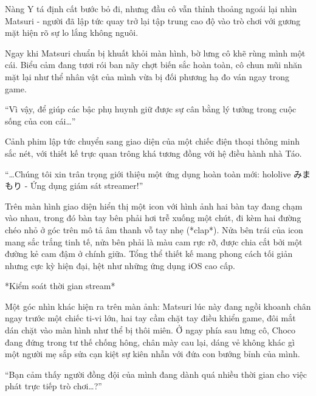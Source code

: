 \documentclass[../main.tex]{subfiles}
\begin{document}
Nàng Y tá định cất bước bỏ đi, nhưng đầu cô vẫn thỉnh thoảng ngoái lại nhìn Matsuri - người đã lập tức quay trở lại tập trung cao độ vào trò chơi với gương mặt hiện rõ sự lo lắng không nguôi.

Ngay khi Matsuri chuẩn bị khuất khỏi màn hình, bờ lưng cô khẽ rùng mình một cái. Biểu cảm đang tươi rói ban nãy chợt biến sắc hoàn toàn, cô chun mũi nhăn mặt lại như thể nhân vật của mình vừa bị đối phương hạ đo ván ngay trong game.

\begin{center}
  ``Vì vậy, để giúp các bậc phụ huynh giữ được sự cân bằng lý tưởng trong cuộc sống của con cái\dots''
\end{center}

Cảnh phim lập tức chuyển sang giao diện của một chiếc điện thoại thông minh sắc nét, với thiết kế trực quan trông khá tương đồng với hệ điều hành nhà Táo.

\begin{center}
  ``\dots Chúng tôi xin trân trọng giới thiệu một ứng dụng hoàn toàn mới: hololive みまもり - Ứng dụng giám sát streamer!''
\end{center}

Trên màn hình giao diện hiển thị một icon với hình ảnh hai bàn tay đang chạm vào nhau, trong đó bàn tay bên phải hơi trễ xuống một chút, đi kèm hai đường chéo nhỏ ở góc trên mô tả âm thanh vỗ tay nhẹ (*clap*). Nửa bên trái của icon mang sắc trắng tinh tế, nửa bên phải là màu cam rực rỡ, được chia cắt bởi một đường kẻ cam đậm ở chính giữa. Tổng thể thiết kế mang phong cách tối giản nhưng cực kỳ hiện đại, hệt như những ứng dụng iOS cao cấp.


\ct

\begin{center}
  *Kiểm soát thời gian stream*
\end{center}

Một góc nhìn khác hiện ra trên màn ảnh: Matsuri lúc này đang ngồi khoanh chân ngay trước một chiếc ti-vi lớn, hai tay cầm chặt tay điều khiển game, đôi mắt dán chặt vào màn hình như thể bị thôi miên. Ở ngay phía sau lưng cô, Choco đang đứng trong tư thế chống hông, chân mày cau lại, dáng vẻ không khác gì một người mẹ sắp sửa cạn kiệt sự kiên nhẫn với đứa con bướng bỉnh của mình.

\begin{center}
  ``Bạn cảm thấy người đồng đội của mình đang dành quá nhiều thời gian cho việc phát trực tiếp trò chơi\dots?''
\end{center}
\end{document}
